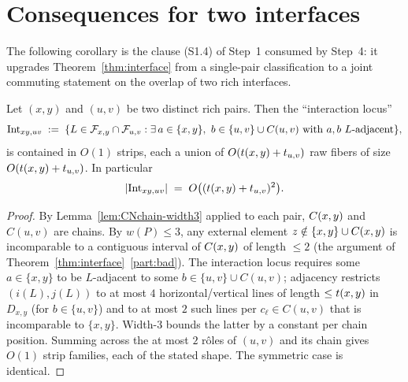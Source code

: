 \section{Consequences for two interfaces}

The following corollary is the clause \textup{(S1.4)} of Step~1 consumed
by Step~4: it upgrades Theorem~\ref{thm:interface} from a single-pair
classification to a joint commuting statement on the overlap of two
rich interfaces.

\begin{lemma}\label{lem:bounded-interaction}
Let $(x,y)$ and $(u,v)$ be two distinct rich pairs. Then the ``interaction
locus''
\[
\mathrm{Int}_{xy,uv}
\;:=\;\{L\in\Fxy\cap\F_{u,v}:
\exists\,a\in\{x,y\},\ b\in\{u,v\}\cup C(u,v)\text{ with }a,b\ L\text{-adjacent}\},
\]
is contained in $O(1)$ strips,
each a union of $O(t(x,y)+t_{u,v})$ raw fibers of size $O(t(x,y)+t_{u,v})$.
In particular
\[
|\mathrm{Int}_{xy,uv}|
\;=\; O\bigl((t(x,y)+t_{u,v})^2\bigr).
\]
\end{lemma}

\begin{proof}
By Lemma~\ref{lem:CNchain-width3} applied to each pair, $C(x,y)$ and $C(u,v)$
are chains. By $w(P)\le 3$, any external element $z\notin\{x,y\}\cup C(x,y)$
is incomparable to a contiguous interval of $C(x,y)$ of length $\le 2$
(the argument of Theorem~\ref{thm:interface}~\ref{part:bad}). The
interaction locus requires some $a\in\{x,y\}$ to be $L$-adjacent to some
$b\in\{u,v\}\cup C(u,v)$; adjacency restricts $(i(L),j(L))$ to at most
$4$ horizontal/vertical lines of length $\le t(x,y)$ in $D_{x,y}$
(for $b\in\{u,v\}$) and to at most $2$ such lines per $c_\ell\in C(u,v)$
that is incomparable to $\{x,y\}$. Width-$3$ bounds the latter by a constant
per chain position. Summing across the at most $2$ rôles of $(u,v)$ and its
chain gives $O(1)$ strip families, each of the stated shape. The symmetric
case is identical.
\end{proof}

